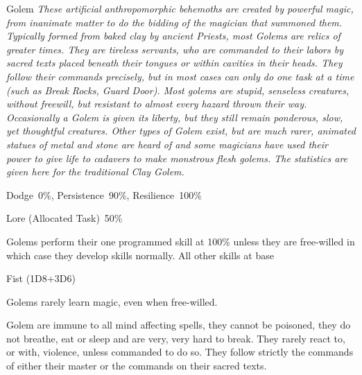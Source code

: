 \newpage

\begin{monsterbox}{Golem}
	\textit{These artificial anthropomorphic behemoths are created by powerful magic, from inanimate matter to do the bidding of the magician that summoned them. Typically formed from baked clay by ancient Priests, most Golems are relics of greater times. They are tireless servants, who are commanded to their labors by sacred texts placed beneath their tongues or within cavities in their heads. They follow their commands precisely, but in most cases can only do one task at a time (such as Break Rocks, Guard Door). Most golems are stupid, senseless creatures, without freewill, but resistant to almost every hazard thrown their way. Occasionally a Golem is given its liberty, but they still remain ponderous, slow, yet thoughtful creatures. Other types of Golem exist, but are much rarer, animated statues of metal and stone are heard of and some magicians have used their power to give life to cadavers to make monstrous flesh golems. The statistics are given here for the traditional Clay Golem.}\\
	\rpghline
	\basics[%
        hitpoints  = 29,
	majorwound = 15,
	damagemodifier = +3D6,
	powerpoints = 4/11 (free willed),
	movementrate = 15m (cannot run),
	armor = Clay Body (8AP or 4AP against crushing weapons),
	plunderrating = 0
	]
	\rpghline%
	\stats[ %
		STR = 6D6+18 (39),
		CON = 3D6+18 (29),
		DEX = 2D6    (7),
		SIZ = 3D6+18 (29),
		INT = 1D6/2D6 (4/7),
		POW = 1D6/3D6 (4/11),
		CHA = 1D6/2D6 (4/7)
	]
	\rpghline%
	\begin{rpg-monsteraction}[Resistances]
		Dodge~0\%, Persistence~90\%, Resilience~100\%
	\end{rpg-monsteraction}
	\begin{rpg-monsteraction}[Knowledge]
		Lore (Allocated Task)~50\%
	\end{rpg-monsteraction}
	\begin{rpg-monsteraction}[Practical]
		Golems perform their one programmed skill at 100\% unless they are free-willed in which case they develop skills normally. All other skills at base %
	\end{rpg-monsteraction}
	\begin{rpg-monsteraction}
		Fist (1D8+3D6)
	\end{rpg-monsteraction}
	\begin{rpg-monsteraction}[Magic]
		Golems rarely learn magic, even when free-willed.
	\end{rpg-monsteraction}
	\begin{rpg-monsteraction}
		Golem are immune to all mind affecting spells, they cannot be poisoned, they do not breathe, eat or sleep and are very, very hard to break. They rarely react to, or with, violence, unless commanded to do so. They follow strictly the commands of either their master or the commands on their sacred texts.
	\end{rpg-monsteraction}

\end{monsterbox}

